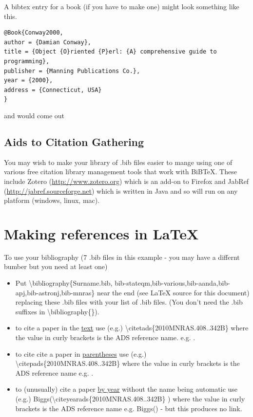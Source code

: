 \documentclass[twoside,fontsize=12pt,
     bibliography=totoc, %
     listof=totoc, %
     index=totoc, %
     onehalfspacing %
]{_MScDiss2017_cls}
\begin{document}
A bibtex entry for a book (if you have to make one) might look something like this.
\begin{verbatim}
@Book{Conway2000,
author = {Damian Conway},
title = {Object {O}riented {P}erl: {A} comprehensive guide to programming},
publisher = {Manning Publications Co.},
year = {2000},
address = {Connecticut, USA}
}
\end{verbatim}
and would come out \cite{Conway2000}

\subsection{Aids to Citation Gathering}
\label{subsec:aids}
You may wish to make your  library of .bib files easier to mange using one of various free citation library management tools that work with BiBTeX. These include Zotero (\url{http://www.zotero.org}) which is an add-on to Firefox and JabRef (\url{http://jabref.sourceforge.net}) which is written in Java and so will run on any platform (windows, linux, mac).

\section{Making references in LaTeX}\label{sec:referencing}
To use your  bibliography (7 .bib files in this example - you may have a differnt bumber but you need at least one)

\begin{itemize}
\item Put \textbackslash  bibliography\{Surname.bib, bib-stateqm,bib-various,bib-aanda,bib-apj,bib-astronj,bib-mnras\} near the end (see LaTeX source for this document) replacing these .bib files with your list of .bib files. (You don't need the .bib suffixes in \textbackslash  bibliography\{\}).
\item to cite a paper in the \underline{text} use (e.g.) \textbackslash citetads\{2010MNRAS.408..342B\}  where the value in curly brackets is the ADS reference name. e.g.  .
\item to cite cite a paper in \underline{parentheses} use (e.g.) \textbackslash citepads\{2010MNRAS.408..342B\}  where the value in curly brackets is the ADS reference name e.g. .
\item to (unusually) cite a paper  \underline{by year} without the name being automatic use (e.g.) Biggs(\textbackslash citeyearads\{2010MNRAS.408..342B\} ) where the value in curly brackets is the ADS reference name e.g. Biggs() - but this produces no link.
\end{itemize}
\end{document}
